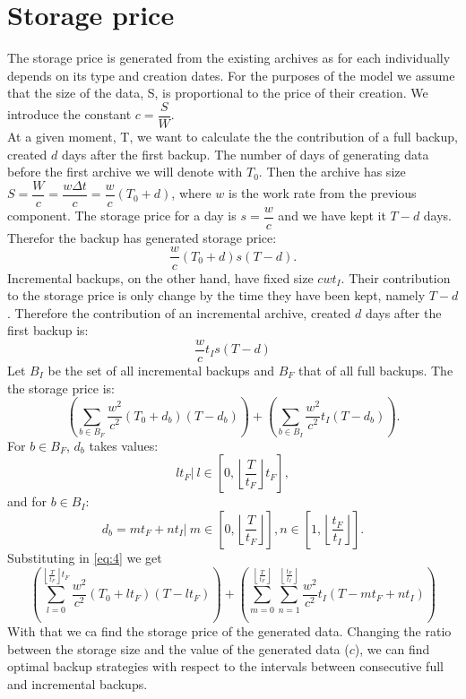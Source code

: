 \documentclass[11pt, a4paper]{article}
\theoremstyle{definition}
\begin{document}
\section{Storage price}
	The storage price is generated from the existing archives as for each individually depends on its type and creation dates. For the purposes of the model we assume that the size of the data, S, is proportional to the price of their creation. We introduce the constant $c=\dfrac{S}{W}$.\\
	At a given moment, T, we want to calculate the the contribution of a full backup, created $d$ days after the first backup. The number of days of generating data before the first archive we will denote with $T_0$. Then the archive has size $S=\dfrac{W}{c}=\dfrac{w\Delta t}{c}=\dfrac{w}{c}(T_0 + d)$, where $w$ is the work rate from the previous component. The storage price for a day is $s=\dfrac{w}{c}$ and we have kept it $T-d$ days. Therefor the backup has generated storage price:
	$$
	\dfrac{w}{c}(T_0 + d)s(T-d).
	$$
	Incremental backups, on the other hand, have fixed size $cwt_I$. Their contribution to the storage price is only change by the time they have been kept, namely $T-d$. Therefore the contribution of an incremental archive, created $d$ days after the first backup is:
	$$
	\dfrac{w}{c}t_Is(T-d)
	$$
	Let $B_I$ be the set of all incremental backups and $B_F$ that of all full backups. The the storage price is:
	\begin{equation}\label{eq:4}
		\left(\displaystyle\sum_{b\in B_F}\dfrac{w^2}{c^2}(T_0 + d_b)(T-d_b)\right) + 	\left(\displaystyle\sum_{b\in B_I}\dfrac{w^2}{c^2}t_I(T-d_b)\right).
	\end{equation}
	For $b\in B_F$, $d_b$ takes values:
	$$lt_F|\ l\in \left[0,\left\lfloor\dfrac{T}{t_F}\right\rfloor t_F\right],$$
	and for $b\in  B_I$:
	$$d_b= mt_F + nt_I|\ m\in \left[0, \left\lfloor\dfrac{T}{t_F}\right\rfloor\right],n\in \left[1, \left\lfloor\dfrac{t_F}{t_I}\right\rfloor\right].$$
	Substituting in \ref{eq:4} we get
	\begin{equation}
		\left(\displaystyle\sum_{l = 0}^{\left\lfloor\frac{T}{t_F}\right\rfloor t_F}\dfrac{w^2}{c^2}(T_0 + lt_F)(T-lt_F)\right) + \left(\displaystyle\sum_{m = 0}^{\left\lfloor\frac{T}{t_F}\right\rfloor}\displaystyle\sum_{n = 1}^{\left\lfloor\frac{t_F}{t_I}\right\rfloor}\dfrac{w^2}{c^2}t_I(T-mt_F + nt_I)\right)
	\end{equation}
	With that we ca find the storage price of the generated data. Changing the ratio between the storage size and the value of the generated data ($c$), we can find optimal backup strategies with respect to the intervals between consecutive full and incremental backups.
\end{document}
